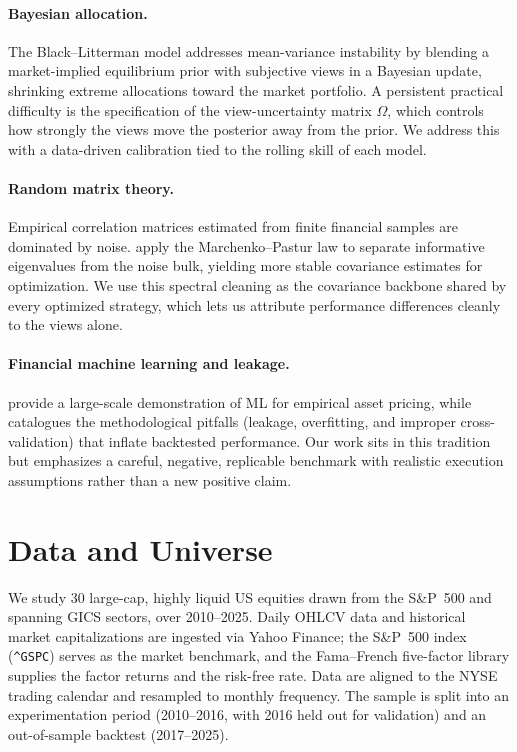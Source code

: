 \documentclass[11pt]{article}
\begin{document}
\paragraph{Bayesian allocation.}
The Black--Litterman model \citep{black1992global,he1999intuition} addresses mean-variance
instability by blending a market-implied equilibrium prior with subjective views in a Bayesian
update, shrinking extreme allocations toward the market portfolio. A persistent practical
difficulty is the specification of the view-uncertainty matrix $\Omega$, which controls how
strongly the views move the posterior away from the prior. We address this with a data-driven
calibration tied to the rolling skill of each model.

\paragraph{Random matrix theory.}
Empirical correlation matrices estimated from finite financial samples are dominated by noise.
\citet{laloux1999noise} apply the Marchenko--Pastur law \citep{marchenko1967distribution} to
separate informative eigenvalues from the noise bulk, yielding more stable covariance estimates
for optimization. We use this spectral cleaning as the covariance backbone shared by every
optimized strategy, which lets us attribute performance differences cleanly to the views alone.

\paragraph{Financial machine learning and leakage.}
\citet{gu2020empirical} provide a large-scale demonstration of ML for empirical asset pricing,
while \citet{lopezdeprado2018advances} catalogues the methodological pitfalls (leakage,
overfitting, and improper cross-validation) that inflate backtested performance. Our work sits in
this tradition but emphasizes a careful, negative, replicable benchmark with realistic execution
assumptions rather than a new positive claim.

\section{Data and Universe}
We study 30 large-cap, highly liquid US equities drawn from the S\&P~500 and spanning GICS
sectors, over 2010--2025. Daily OHLCV data and historical market capitalizations are ingested via
Yahoo Finance; the S\&P~500 index (\verb|^GSPC|) serves as the market benchmark, and the
Fama--French five-factor library \citep{famafrench2015five} supplies the factor returns and the
risk-free rate. Data are aligned to the NYSE trading calendar and resampled to monthly frequency.
The sample is split into an experimentation period (2010--2016, with 2016 held out for
validation) and an out-of-sample backtest (2017--2025).
\end{document}
